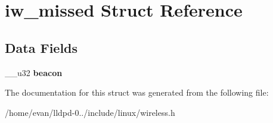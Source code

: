 \section{iw\-\_\-missed \-Struct \-Reference}
\label{structiw__missed}
\subsection*{\-Data \-Fields}
\begin{DoxyCompactItemize}
\item 
\-\_\-\-\_\-u32 {\bfseries beacon}\label{structiw__missed_a7ee5f5514aef590ec55388b1eff07751}

\end{DoxyCompactItemize}


\-The documentation for this struct was generated from the following file\-:\begin{DoxyCompactItemize}
\item 
/home/evan/lldpd-\/0../include/linux/wireless.\-h\end{DoxyCompactItemize}
